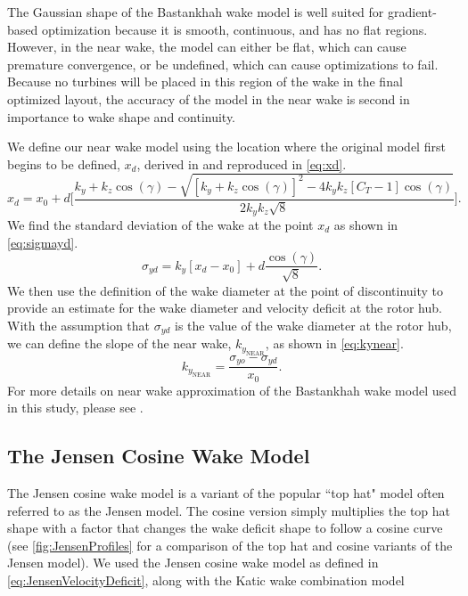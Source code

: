 \documentclass{jpconf}
\begin{document}
The Gaussian shape of the Bastankhah wake model is well suited for gradient-based optimization because it is smooth, continuous, and has no flat regions. However, in the near wake, the model can either be flat, which can cause premature convergence, or be undefined, which can cause optimizations to fail. Because no turbines will be placed in this region of the wake in the final optimized layout, the accuracy of the model in the near wake is second in importance to wake shape and continuity. 

We define our near wake model using the location where the original model first begins to be defined, $x_d$, derived in \cite{thomas2019-les-validation} and reproduced in \cref{eq:xd}.
%
\begin{equation}\label{eq:xd}
x_d = x_0 +d \Bigg[ \frac{k_y+k_z\cos{(\gamma)} - \sqrt{[k_y+k_z\cos{(\gamma)}]^2-4k_y k_z[C_T-1]\cos{(\gamma)}}}{2k_y k_z\sqrt{8}}\Bigg].
\end{equation}
%
We find the standard deviation of the wake at the point $x_d$ as shown in \cref{eq:sigmayd}.
%
\begin{equation}\label{eq:sigmayd}
\sigma_{yd} = k_y [x_d - x_0] + d\frac{\cos{(\gamma)}}{\sqrt{8}}.
\end{equation}
%
We then use the definition of the wake diameter at the point of discontinuity to provide an estimate for the wake diameter and velocity deficit at the rotor hub. With the assumption that $\sigma_{yd}$ is the value of the wake diameter at the rotor hub, we can define the slope of the near wake, $k_{y_{\text{NEAR}}}$, as shown in \cref{eq:kynear}.
%
\begin{equation}\label{eq:kynear}
k_{y_{\text{NEAR}}} = \frac{\sigma_{yo}-\sigma_{yd}}{x_0}.
\end{equation}
For more details on near wake approximation of the Bastankhah wake model used in this study, please see \cite{thomas2019-les-validation}.

\subsection{The Jensen Cosine Wake Model}
The Jensen cosine wake model is a variant of the popular ``top hat" model often referred to as the Jensen model. The cosine version simply multiplies the top hat shape with a factor that changes the wake deficit shape to follow a cosine curve (see \cref{fig:JensenProfiles} for a comparison of the top hat and cosine variants of the Jensen model). We used the Jensen cosine wake model as defined in \cref{eq:JensenVelocityDeficit}, along with the Katic wake combination model \cite{katic1986}
\end{document}
